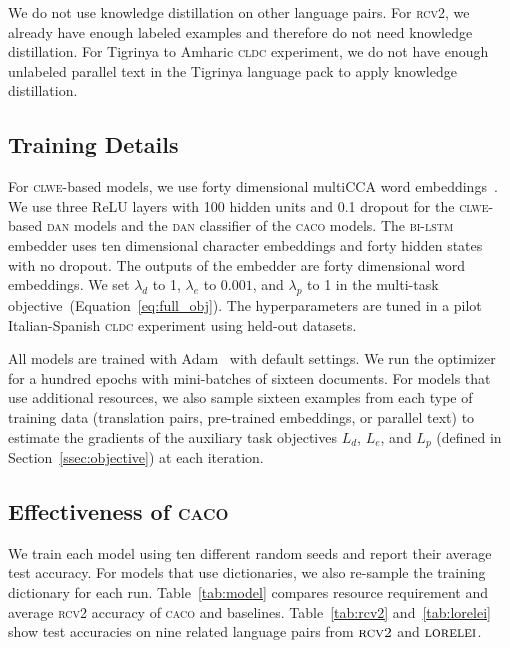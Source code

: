 \documentclass[letterpaper]{article} %
\newcommand{\citep}{\cite}
\newcommand{\abr}[1]{\textsc{#1}}
\newcommand{\name}[0]{\textsc{caco}}
\begin{document}
We do not use knowledge distillation on other language pairs.
For \abr{rcv2}, we already have enough labeled examples and therefore do not
need knowledge distillation.
For Tigrinya to Amharic \abr{cldc} experiment, we do not have enough unlabeled
parallel text in the Tigrinya language pack to apply knowledge distillation.

\subsection{Training Details}
\label{sec:hyperparameter}

For \abr{clwe}-based models, we use forty dimensional multiCCA
word embeddings~\citep{ammar-16}.
We use three ReLU layers with 100 hidden units and 0.1 dropout for the
\abr{clwe}-based \abr{dan} models and the \abr{dan} classifier of the \name{}
models.
The \abr{bi-lstm} embedder uses ten dimensional character embeddings and forty
hidden states with no dropout.  The outputs of the embedder are forty
dimensional word embeddings.
We set $\lambda_d$ to 1, $\lambda_e$ to $0.001$, and $\lambda_p$ to 1 in the
multi-task objective~(Equation~\ref{eq:full_obj}).
The hyperparameters are tuned in a pilot Italian-Spanish \abr{cldc} experiment
using held-out datasets.

All models are trained with Adam~\citep{kingma-15} with default settings.
We run the optimizer for a hundred epochs with mini-batches of sixteen
documents.  For models that use additional resources, we also sample sixteen
examples from each type of training data (translation pairs, pre-trained
embeddings, or parallel text) to estimate the gradients of the auxiliary task
objectives $L_d$, $L_e$, and $L_p$ (defined in Section~\ref{ssec:objective}) at each
iteration.

\subsection{Effectiveness of \name{}}\label{ssec:analysis}

We train each model using ten different random seeds and report their average
test accuracy.
For models that use dictionaries, we also re-sample the training dictionary for
each run.
Table~\ref{tab:model} compares resource requirement and average \abr{rcv2}
accuracy of \name{} and baselines.
Table~\ref{tab:rcv2} and~\ref{tab:lorelei} show test accuracies on nine related
language pairs from $\abr{rcv2}$ and $\abr{lorelei}$.
\end{document}
